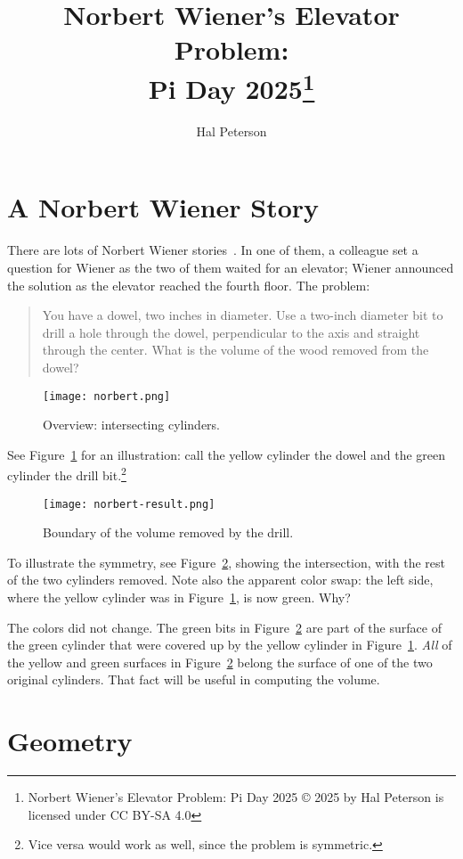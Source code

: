 \documentclass[twocolumn]{article}
\title{Norbert Wiener's Elevator Problem: \\
  Pi Day 2025\footnote{Norbert Wiener's Elevator Problem: Pi Day 2025
  © 2025 by Hal Peterson is licensed under CC BY-SA 4.0}}
\author{Hal Peterson}
\theoremstyle{definition}
\theoremstyle{plain}
\begin{document}
\maketitle

\section{A Norbert Wiener Story}

There are lots of Norbert Wiener stories~\cite{Hardesty2021}.  In one
of them, a colleague 
set a question for Wiener as the two of them waited for an elevator;
Wiener announced the solution as the elevator reached the fourth
floor.  The problem:
\begin{quotation}
  You have a dowel, two inches in diameter.  Use a two-inch diameter
  bit to drill a hole through the dowel, perpendicular to the axis and
  straight through the center.  What is the volume of the wood removed
  from the dowel?
\end{quotation}

\begin{figure}
  \texttt{[image: norbert.png]}
  \caption{Overview:  intersecting cylinders.}
  \label{fig:overview}
\end{figure}

See Figure~\ref{fig:overview} for an illustration:  call the yellow
cylinder the dowel and the green cylinder the drill bit.\footnote{Vice
versa would work as well, since the problem is symmetric.}

\begin{figure}
  \texttt{[image: norbert-result.png]}
  \caption{Boundary of the volume removed by the drill.}
  \label{fig:boundary}
\end{figure}

To illustrate the symmetry, see Figure~\ref{fig:boundary}, showing the
intersection, with the rest of the two cylinders removed.  Note
also the apparent color swap:  the left side, where the yellow
cylinder was in Figure~\ref{fig:overview}, is now green.  Why?

The colors did not change.  The green bits in
Figure~\ref{fig:boundary} are part of the surface of the green
cylinder that were covered up by the yellow cylinder in
Figure~\ref{fig:overview}.  \emph{All} of the yellow and green
surfaces in Figure~\ref{fig:boundary} belong the surface of one of the
two original cylinders.  That fact will be useful in computing the
volume.

\section{Geometry}
\end{document}
